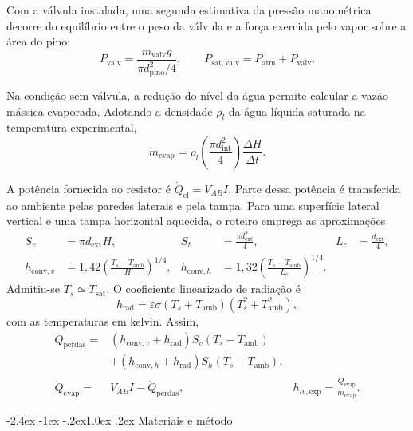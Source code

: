 \documentclass[11pt,a4paper]{article}
\makeatletter
\renewcommand\section{\@startsection{section}{1}{\z@}%
  {-2.4ex \@plus -1ex \@minus -.2ex}{1.0ex \@plus .2ex}%
  {\normalfont\large\bfseries\color{petrol}}}
\newcommand{\Tsat}{T_{\mathrm{sat}}}
\newcommand{\Qdot}{\dot Q}
\newcommand{\mdot}{\dot m}
\makeatother
\begin{document}
Com a válvula instalada, uma segunda estimativa da pressão manométrica decorre
do equilíbrio entre o peso da válvula e a força exercida pelo vapor sobre a
área do pino:
\begin{equation}
  P_{\mathrm{valv}}=\frac{m_{\mathrm{valv}}g}
  {\pi d_{\mathrm{pino}}^2/4},
  \qquad
  P_{\mathrm{sat,valv}}=P_{\mathrm{atm}}+P_{\mathrm{valv}}.
  \label{eq:valvula}
\end{equation}

Na condição sem válvula, a redução do nível da água permite calcular a vazão
mássica evaporada. Adotando a densidade $\rho_l$ da água líquida saturada na
temperatura experimental,
\begin{equation}
  \mdot_{\mathrm{evap}}=\rho_l\left(\frac{\pi d_{\mathrm{int}}^2}{4}\right)
  \frac{\Delta H}{\Delta t}.
  \label{eq:mdot}
\end{equation}

A potência fornecida ao resistor é $\Qdot_{\mathrm{el}}=V_{AB}I$. Parte dessa
potência é transferida ao ambiente pelas paredes laterais e pela tampa. Para
uma superfície lateral vertical e uma tampa horizontal aquecida, o roteiro
emprega as aproximações~\cite{roteiro}
\begin{align}
  S_v&=\pi d_{\mathrm{ext}}H,
  &S_h&=\frac{\pi d_{\mathrm{ext}}^2}{4},
  &L_c&=\frac{d_{\mathrm{ext}}}{4},
  \label{eq:areas}\\
  h_{\mathrm{conv},v}&=1{,}42
  \left(\frac{T_s-T_{\mathrm{amb}}}{H}\right)^{1/4},
  &h_{\mathrm{conv},h}&=1{,}32
  \left(\frac{T_s-T_{\mathrm{amb}}}{L_c}\right)^{1/4}.
  \label{eq:hconv}
\end{align}
Admitiu-se $T_s\simeq\Tsat$. O coeficiente linearizado de radiação é
\begin{equation}
  h_{\mathrm{rad}}=\varepsilon\sigma(T_s+T_{\mathrm{amb}})
  (T_s^2+T_{\mathrm{amb}}^2),
  \label{eq:hrad}
\end{equation}
com as temperaturas em kelvin. Assim,
\begin{align}
  \Qdot_{\mathrm{perdas}}={}&
  (h_{\mathrm{conv},v}+h_{\mathrm{rad}})S_v(T_s-T_{\mathrm{amb}})
  \nonumber\\[-0.2em]
  &+(h_{\mathrm{conv},h}+h_{\mathrm{rad}})S_h(T_s-T_{\mathrm{amb}}),
  \label{eq:qperdas}\\
  \Qdot_{\mathrm{evap}}={}&V_{AB}I-\Qdot_{\mathrm{perdas}},
  &h_{lv,\mathrm{exp}}=\frac{\Qdot_{\mathrm{evap}}}{\mdot_{\mathrm{evap}}}.
  \label{eq:hlv}
\end{align}

\section{Materiais e método}
\end{document}
